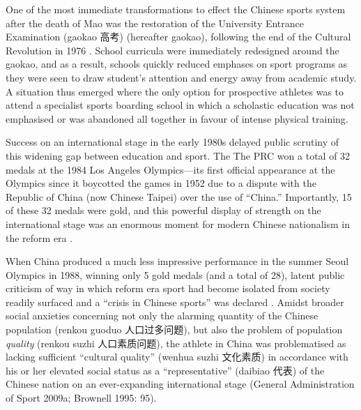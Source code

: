 One of the most immediate transformations to effect the Chinese sports system after the death of Mao was the restoration of the University Entrance Examination (gaokao 高考)
(hereafter gaokao), following the end of the Cultural Revolution in 1976 \citep[198]{Brownell1995}.  School curricula were immediately redesigned around the gaokao, and as a result, schools quickly reduced emphases on sport programs as they were seen to draw student’s attention and energy away from academic study.  A situation thus emerged where the only option for prospective athletes was to attend a specialist sports boarding school in which a scholastic education was not emphasised or was abandoned all together in favour of intense physical training.

Success on an international stage in the early 1980s delayed public scrutiny of this widening gap between education and sport. The The PRC won a total of 32 medals at the 1984 Los Angeles Olympics---its first official appearance at the Olympics since it boycotted the games in 1952 due to a dispute with the Republic of China (now Chinese Taipei) over the use of ``China.''  Importantly, 15 of these 32 medals were gold, and this powerful display of strength on the international stage was an enormous moment for modern Chinese nationalism in the reform era \citep{Brownell2008}.

When China produced a much less impressive performance in the summer Seoul Olympics in 1988, winning only 5 gold medals (and a total of 28), latent public criticism of way in which reform era sport had become isolated from society readily surfaced and a ``crisis in Chinese sports'' was declared \citep[199]{Brownell1995}.  Amidst broader social anxieties concerning not only the alarming quantity of the Chinese population (renkou guoduo 人口过多问题), but also the problem of population \textit{quality} (renkou suzhi 人口素质问题), the athlete in China was problematised as lacking sufficient ``cultural quality'' (wenhua suzhi 文化素质) in accordance with his or her elevated social status as a ``representative'' (daibiao 代表) of the Chinese nation on an ever-expanding international stage (General Administration of Sport 2009a; Brownell 1995: 95).

